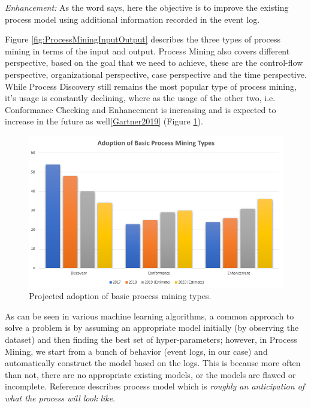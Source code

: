 \textit{Enhancement:} As the word says, here the objective is to improve the existing process model using additional information recorded in the event log.

Figure \ref{fig:ProcessMiningInputOutput} describes the three types of process mining in terms of the input and output. Process Mining also covers different perspective, based on the goal that we need to achieve, these are the control-flow perspective, organizational perspective, case perspective and the time perspective. While Process Discovery still remains the most popular type of process mining, it's usage is constantly declining, where as the usage of the other two, i.e. Conformance Checking and Enhancement is increasing and is expected to increase in the future as well\ref{Gartner2019} (Figure \ref{fig:Adoption}).

\begin{figure}[h]
	\centering
	\includegraphics[width=\columnwidth]{images/adoption.png}
	\caption{Projected adoption of basic process mining types.}
	\label{fig:Adoption}
\end{figure}

As can be seen in various machine learning algorithms, a common approach to solve a problem is by assuming an appropriate model initially (by observing the dataset) and then finding the best set of hyper-parameters; however, in Process Mining, we start from a bunch of behavior (event logs, in our case) and automatically construct the model based on the logs. This is because more often than not, there are no appropriate existing models, or the models are flawed or incomplete. Reference\cite{Rolland1998} describes process model which is \textit{roughly an anticipation of what the process will look like}. 

